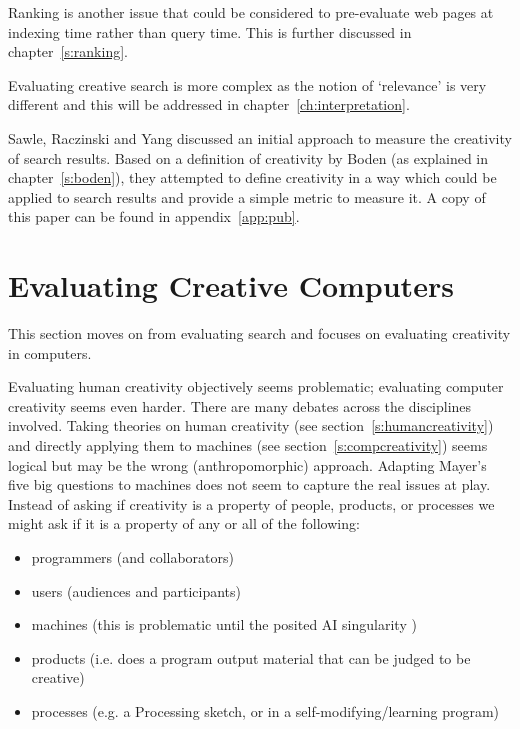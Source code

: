 Ranking is another issue that could be considered to pre-evaluate web pages at indexing time rather than query time. This is further discussed in chapter~\ref{s:ranking}.

\spirals

Evaluating creative search is more complex as the notion of `relevance' is very different and this will be addressed in chapter~\ref{ch:interpretation}. 

Sawle, Raczinski and Yang \citeyear{Sawle2011} discussed an initial approach to measure the creativity of search results. Based on a definition of creativity by Boden (as explained in chapter~\ref{s:boden}), they attempted to define creativity in a way which could be applied to search results and provide a simple metric to measure it. A copy of this paper can be found in appendix~\ref{app:pub}.


\section{Evaluating Creative Computers}
\label{s:creattributes}

This section moves on from evaluating search and focuses on evaluating creativity in computers.

Evaluating human creativity objectively seems problematic; evaluating computer creativity seems even harder. There are many debates across the disciplines involved. Taking theories on human creativity (see section~\ref{s:humancreativity}) and directly applying them to machines (see section~\ref{s:compcreativity}) seems logical but may be the wrong (anthropomorphic) approach. Adapting Mayer's five big questions \citeyear{Mayer1999} to machines does not seem to capture the real issues at play. Instead of asking if creativity is a property of people, products, or processes we might ask if it is a property of any or all of the following:

\begin{itemize}
  \item programmers (and collaborators)
  \item users (audiences and participants)
  \item machines (this is problematic until the posited AI singularity \cite{Schmidhuber2006a})
  \item products (i.e. does a program output material that can be judged to be creative)
  \item processes (e.g. a Processing sketch, or in a self-modifying/learning program)
\end{itemize}


